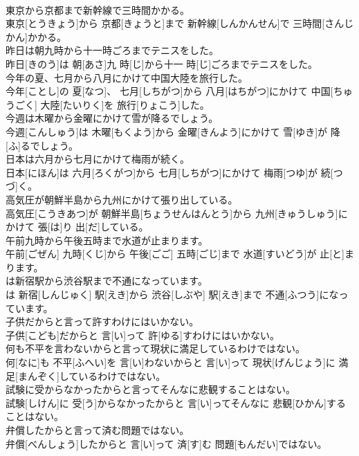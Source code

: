 \documentclass[8pt]{extreport}
\begin{document}
\begin{CJK}{UTF8}{min}
\\	東京から京都まで新幹線で三時間かかる。	
\\	東京[とうきょう]から 京都[きょうと]まで 新幹線[しんかんせん]で 三時間[さんじかん]かかる。
\\	昨日は朝九時から十一時ごろまでテニスをした。	
\\	昨日[きのう]は 朝[あさ]九 時[じ]から十一 時[じ]ごろまでテニスをした。
\\	今年の夏、七月から八月にかけて中国大陸を旅行した。	
\\	今年[ことし]の 夏[なつ]、 七月[しちがつ]から 八月[はちがつ]にかけて 中国[ちゅうごく] 大陸[たいりく]を 旅行[りょこう]した。
\\	今週は木曜から金曜にかけて雪が降るでしょう。	
\\	今週[こんしゅう]は 木曜[もくよう]から 金曜[きんよう]にかけて 雪[ゆき]が 降[ふ]るでしょう。
\\	日本は六月から七月にかけて梅雨が続く。	
\\	日本[にほん]は 六月[ろくがつ]から 七月[しちがつ]にかけて 梅雨[つゆ]が 続[つづ]く。
\\	高気圧が朝鮮半島から九州にかけて張り出している。	
\\	高気圧[こうきあつ]が 朝鮮半島[ちょうせんはんとう]から 九州[きゅうしゅう]にかけて 張[は]り 出[だ]している。
\\	午前九時から午後五時まで水道が止まります。	
\\	午前[ごぜん] 九時[くじ]から 午後[ごご] 五時[ごじ]まで 水道[すいどう]が 止[と]まります。
\\	は新宿駅から渋谷駅まで不通になっています。	
\\	は 新宿[しんじゅく] 駅[えき]から 渋谷[しぶや] 駅[えき]まで 不通[ふつう]になっています。
\\	子供だからと言って許すわけにはいかない。	
\\	子供[こども]だからと 言[い]って 許[ゆる]すわけにはいかない。
\\	何も不平を言わないからと言って現状に満足しているわけではない。	
\\	何[なに]も 不平[ふへい]を 言[い]わないからと 言[い]って 現状[げんじょう]に 満足[まんぞく]しているわけではない。
\\	試験に受からなかったからと言ってそんなに悲観することはない。	
\\	試験[しけん]に 受[う]からなかったからと 言[い]ってそんなに 悲観[ひかん]することはない。
\\	弁償したからと言って済む問題ではない。	
\\	弁償[べんしょう]したからと 言[い]って 済[す]む 問題[もんだい]ではない。

\end{CJK}
\end{document}
